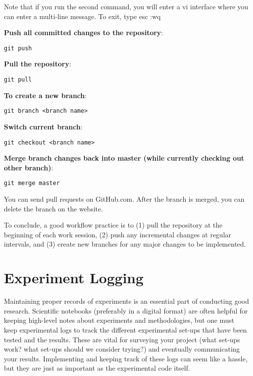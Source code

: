 \noindent Note that if you run the second command, you will enter a vi interface where you can enter a multi-line message. To exit, type esc :wq

\noindent \textbf{Push all committed changes to the repository}:

\begin{lstlisting}[style=python]
git push
\end{lstlisting}

\noindent \textbf{Pull the repository}:

\begin{lstlisting}[style=python]
git pull
\end{lstlisting}

\noindent \textbf{To create a new branch}:

\begin{lstlisting}[style=python]
git branch <branch name>
\end{lstlisting}

\noindent \textbf{Switch current branch}:

\begin{lstlisting}[style=python]
git checkout <branch name>
\end{lstlisting}

\noindent \textbf{Merge branch changes back into master (while currently checking out other branch)}:

\begin{lstlisting}[style=python]
git merge master
\end{lstlisting}

\noindent You can send pull requests on GitHub.com. After the branch is merged, you can delete the branch on the website.
\newline

\noindent To conclude, a good workflow practice is to (1) pull the repository at the beginning of each work session, (2) push any incremental changes at regular intervals, and (3) create new branches for any major changes to be implemented.

\section{Experiment Logging}

Maintaining proper records of experiments is an essential part of conducting good research. Scientific notebooks (preferably in a digital format) are often helpful for keeping high-level notes about experiments and methodologies, but one must keep experimental logs to track the different experimental set-ups that have been tested and the results. These are vital for surveying your project (what set-ups work? what set-ups should we consider trying?) and eventually communicating your results. Implementing and keeping track of these logs can seem like a hassle, but they are just as important as the experimental code itself.

